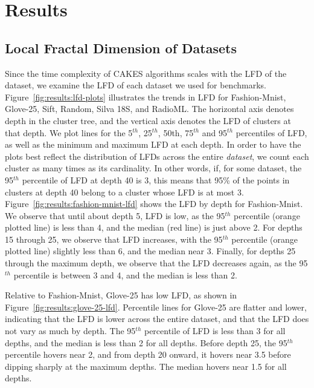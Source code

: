 \section{Results}
\label{sec:results}


\subsection{Local Fractal Dimension of Datasets}
\label{sec:results:lfd-of-datasets}

Since the time complexity of CAKES algorithms scales with the LFD of the dataset, we examine the LFD of each dataset we used for benchmarks.
Figure~\ref{fig:results:lfd-plots} illustrates the trends in LFD for Fashion-Mnist, Glove-25, Sift, Random, Silva 18S, and RadioML.
The horizontal axis denotes depth in the cluster tree, and the vertical axis denotes the LFD of clusters at that depth.
We plot lines for the 5$^{th}$, 25$^{th}$, 50th, 75$^{th}$ and 95$^{th}$ percentiles of LFD, as well as the minimum and maximum LFD at each depth.
In order to have the plots best reflect the distribution of LFDs across the entire \textit{dataset}, we count each cluster as many times as its cardinality.
In other words, if, for some dataset, the 95$^{th}$ percentile of LFD at depth 40 is 3, this means that 95\% of the points in clusters at depth 40 belong to a cluster whose LFD is at most 3.
Figure~\ref{fig:results:fashion-mnist-lfd} shows the LFD by depth for Fashion-Mnist.
We observe that until about depth 5, LFD is low, as the 95$^{th}$ percentile (orange plotted line) is less than 4, and the median (red line) is just above 2.
For depths 15 through 25, we observe that LFD increases, with the 95$^{th}$ percentile (orange plotted line) slightly less than 6, and the median near 3.
Finally, for depths 25 through the maximum depth, we observe that the LFD decreases again, as the 95$^{th}$ percentile is between 3 and 4, and the median is less than 2.

Relative to Fashion-Mnist, Glove-25 has low LFD, as shown in Figure~\ref{fig:results:glove-25-lfd}.
Percentile lines for Glove-25 are flatter and lower, indicating that the LFD is lower across the entire dataset, and that the LFD does not vary as much by depth.
The 95$^{th}$ percentile of LFD is less than 3 for all depths, and the median is less than 2 for all depths.
Before depth 25, the 95$^{th}$ percentile hovers near 2, and from depth 20 onward, it hovers near 3.5 before dipping sharply at the maximum depths.
The median hovers near 1.5 for all depths.

